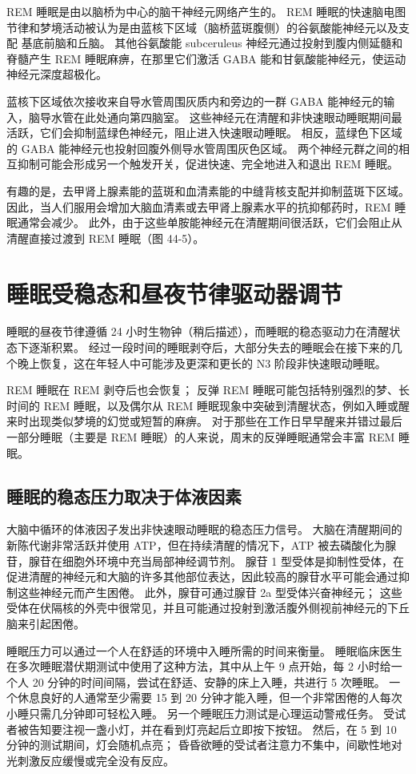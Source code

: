REM 睡眠是由以脑桥为中心的脑干神经元网络产生的。 REM 睡眠的快速脑电图节律和梦境活动被认为是由蓝核下区域（脑桥蓝斑腹侧）的谷氨酸能神经元以及支配 基底前脑和丘脑。 其他谷氨酸能 subceruleus 神经元通过投射到腹内侧延髓和脊髓产生 REM 睡眠麻痹，在那里它们激活 GABA 能和甘氨酸能神经元，使运动神经元深度超极化。

蓝核下区域依次接收来自导水管周围灰质内和旁边的一群 GABA 能神经元的输入，脑导水管在此处通向第四脑室。 这些神经元在清醒和非快速眼动睡眠期间最活跃，它们会抑制蓝绿色神经元，阻止进入快速眼动睡眠。 相反，蓝绿色下区域的 GABA 能神经元也投射回腹外侧导水管周围灰色区域。 两个神经元群之间的相互抑制可能会形成另一个触发开关，促进快速、完全地进入和退出 REM 睡眠。

有趣的是，去甲肾上腺素能的蓝斑和血清素能的中缝背核支配并抑制蓝斑下区域。 因此，当人们服用会增加大脑血清素或去甲肾上腺素水平的抗抑郁药时，REM 睡眠通常会减少。 此外，由于这些单胺能神经元在清醒期间很活跃，它们会阻止从清醒直接过渡到 REM 睡眠（图 44-5）。


\section{睡眠受稳态和昼夜节律驱动器调节}
睡眠的昼夜节律遵循 24 小时生物钟（稍后描述），而睡眠的稳态驱动力在清醒状态下逐渐积累。 经过一段时间的睡眠剥夺后，大部分失去的睡眠会在接下来的几个晚上恢复，这在年轻人中可能涉及更深和更长的 N3 阶段非快速眼动睡眠。


REM 睡眠在 REM 剥夺后也会恢复； 反弹 REM 睡眠可能包括特别强烈的梦、长时间的 REM 睡眠，以及偶尔从 REM 睡眠现象中突破到清醒状态，例如入睡或醒来时出现类似梦境的幻觉或短暂的麻痹。 对于那些在工作日早早醒来并错过最后一部分睡眠（主要是 REM 睡眠）的人来说，周末的反弹睡眠通常会丰富 REM 睡眠。

\subsection{睡眠的稳态压力取决于体液因素}
大脑中循环的体液因子发出非快速眼动睡眠的稳态压力信号。 大脑在清醒期间的新陈代谢非常活跃并使用 ATP，但在持续清醒的情况下，ATP 被去磷酸化为腺苷，腺苷在细胞外环境中充当局部神经调节剂。 腺苷 1 型受体是抑制性受体，在促进清醒的神经元和大脑的许多其他部位表达，因此较高的腺苷水平可能会通过抑制这些神经元而产生困倦。 此外，腺苷可通过腺苷 2a 型受体兴奋神经元； 这些受体在伏隔核的外壳中很常见，并且可能通过投射到激活腹外侧视前神经元的下丘脑来引起困倦。

睡眠压力可以通过一个人在舒适的环境中入睡所需的时间来衡量。 睡眠临床医生在多次睡眠潜伏期测试中使用了这种方法，其中从上午 9 点开始，每 2 小时给一个人 20 分钟的时间间隔，尝试在舒适、安静的床上入睡，共进行 5 次睡眠。 一个休息良好的人通常至少需要 15 到 20 分钟才能入睡，但一个非常困倦的人每次小睡只需几分钟即可轻松入睡。 另一个睡眠压力测试是心理运动警戒任务。 受试者被告知要注视一盏小灯，并在看到灯亮起后立即按下按钮。 然后，在 5 到 10 分钟的测试期间，灯会随机点亮； 昏昏欲睡的受试者注意力不集中，间歇性地对光刺激反应缓慢或完全没有反应。

